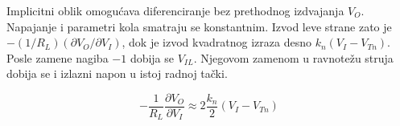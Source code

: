 Implicitni oblik omogućava diferenciranje bez prethodnog izdvajanja $V_O$. Napajanje i parametri kola smatraju se konstantnim. Izvod leve strane zato je $-(1/R_L)(\partial V_O/\partial V_I)$, dok je izvod kvadratnog izraza desno $k_n(V_I-V_{Tn})$. Posle zamene nagiba $-1$ dobija se $V_{IL}$. Njegovom zamenom u ravnotežu struja dobija se i izlazni napon u istoj radnoj tački.

\[-\frac1{R_L}\frac{\partial V_O}{\partial V_I}\approx2\frac{k_n}{2}(V_I-V_{Tn})\]

